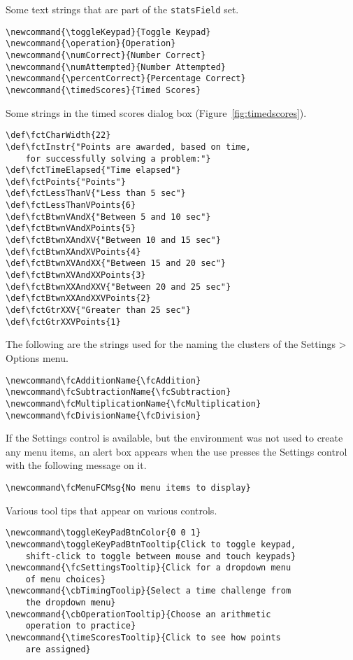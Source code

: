 \documentclass{article}
\makeatletter
\let\uif\textsf
\let\bslash=\@backslashchar
\def\cs#1{\texttt{\bslash#1}}
\makeatother
\begin{document}
Some text strings that are part of the \cs{statsField} set.
\begin{Verbatim}[xleftmargin=\amtIndent]
\newcommand{\toggleKeypad}{Toggle Keypad}
\newcommand{\operation}{Operation}
\newcommand{\numCorrect}{Number Correct}
\newcommand{\numAttempted}{Number Attempted}
\newcommand{\percentCorrect}{Percentage Correct}
\newcommand{\timedScores}{Timed Scores}
\end{Verbatim}
Some strings in the timed scores dialog box (Figure~\ref{fig:timedscores}).
\begin{Verbatim}[xleftmargin=\amtIndent]
\def\fctCharWidth{22}
\def\fctInstr{"Points are awarded, based on time,
    for successfully solving a problem:"}
\def\fctTimeElapsed{"Time elapsed"}
\def\fctPoints{"Points"}
\def\fctLessThanV{"Less than 5 sec"}
\def\fctLessThanVPoints{6}
\def\fctBtwnVAndX{"Between 5 and 10 sec"}
\def\fctBtwnVAndXPoints{5}
\def\fctBtwnXAndXV{"Between 10 and 15 sec"}
\def\fctBtwnXAndXVPoints{4}
\def\fctBtwnXVAndXX{"Between 15 and 20 sec"}
\def\fctBtwnXVAndXXPoints{3}
\def\fctBtwnXXAndXXV{"Between 20 and 25 sec"}
\def\fctBtwnXXAndXXVPoints{2}
\def\fctGtrXXV{"Greater than 25 sec"}
\def\fctGtrXXVPoints{1}
\end{Verbatim}
The following are the strings used for the naming the clusters of the \uif{Settings > Options} menu.
\begin{Verbatim}[xleftmargin=\amtIndent]
\newcommand\fcAdditionName{\fcAddition}
\newcommand\fcSubtractionName{\fcSubtraction}
\newcommand\fcMultiplicationName{\fcMultiplication}
\newcommand\fcDivisionName{\fcDivision}
\end{Verbatim}
If the \uif{Settings} control is available, but the  environment was not
used to create any menu items, an alert box appears when the use presses the
\uif{Settings} control with the following message on it.
\begin{Verbatim}[xleftmargin=\amtIndent]
\newcommand\fcMenuFCMsg{No menu items to display}
\end{Verbatim}
Various tool tips that appear on various controls.
\begin{Verbatim}[xleftmargin=\amtIndent]
\newcommand\toggleKeyPadBtnColor{0 0 1}
\newcommand\toggleKeyPadBtnTooltip{Click to toggle keypad,
    shift-click to toggle between mouse and touch keypads}
\newcommand{\fcSettingsTooltip}{Click for a dropdown menu
    of menu choices}
\newcommand{\cbTimingToolip}{Select a time challenge from
    the dropdown menu}
\newcommand{\cbOperationTooltip}{Choose an arithmetic
    operation to practice}
\newcommand{\timeScoresTooltip}{Click to see how points
    are assigned}
\end{Verbatim}
\end{document}
